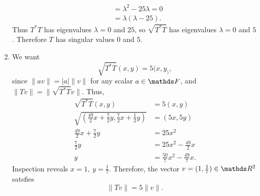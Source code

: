 \documentclass{homework}
\begin{document}
\begin{solution}
\begin{enumerate}[label=(\alph*)]
\begin{align*}
                                      &= \lambda^2-25\lambda=0 \\
                                      &=\lambda(\lambda-25)
  .\end{align*}
  Thus $T^*T$ has eigenvalues $\lambda=0$ and $25$, so $\sqrt{T^*T}$ has eigenvalues $ \lambda=0$
  and $5$. Therefore $T$ has singular values $0$ and $5$.
    \item We want \[
        \sqrt{T^*T}(x,y)=5(x,y_)
    ,\] since $\|av\|=\left| a \right| \|v\|$ for any scalar $a\in \F$, and
    $\|Tv\|=\|\sqrt{T^*T}v\|$. Thus,
    \begin{align*}
      \sqrt{T^*T}(x,y)&= 5(x,y) \\
      \sqrt{(\frac{49}{2}x+\frac{7}{2}y,\frac{7}{2}x+\frac{1}{2}y)}&=(5x,5y)\\
      \frac{49}{2}x+\frac{7}{2}y&= 25x^2 \\
      \frac{7}{2}y&= 25x^2-\frac{49}{2}x \\
      y&=\frac{50}{7}x^2-\frac{49}{7}x
    .\end{align*}
    Inspection reveals $x=1,\ y=\frac{1}{7}$. Therefore, the vector $v=(1,\frac{1}{7})\in \R^2$
    satsfies \[
      \|Tv\|=5\|v\|
    .\] 
  \end{enumerate}
\end{solution}
\end{document}
